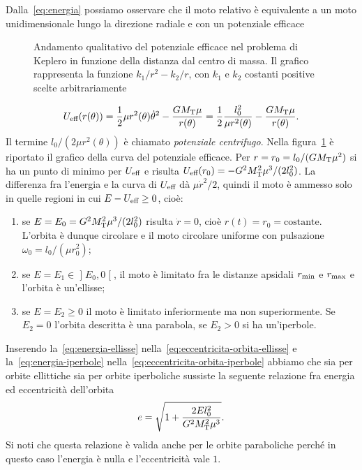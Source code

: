 Dalla~\eqref{eq:energia} possiamo osservare che il moto relativo è equivalente a
un moto unidimensionale lungo la direzione radiale e con un potenziale efficace
\begin{figure} %
  \centering
  
  \caption[Andamento del potenziale efficace in funzione della distanza dal
  centro di massa]{Andamento qualitativo del potenziale efficace nel problema di
    Keplero in funzione della distanza dal centro di massa. Il grafico
    rappresenta la funzione $k_1/r^2-k_2/r$, con $k_1$ e $k_2$ costanti positive
    scelte arbitrariamente}
  \label{fig:potenziale-efficace}
\end{figure}
\begin{equation}
  U_\textup{eff}(r(\theta)) = \frac{1}{2}\mu r^2(\theta)\dot{\theta}^2 -
  \frac{GM_\textup{T}\mu}{r(\theta)} = \frac{1}{2}\frac{l_0^2}{\mu r^2(\theta)} -
  \frac{GM_\textup{T}\mu}{r(\theta)}.
\end{equation}
Il termine $l_0/(2\mu r^2(\theta))$ è chiamato \emph{potenziale
  centrifugo}. Nella figura~\ref{fig:potenziale-efficace} è riportato il grafico
della curva del potenziale efficace. Per $r=r_0=l_0/(GM_\textup{T}\mu^2)$ si ha
un punto di minimo per $U_\textup{eff}$ e risulta $U_\textup{eff}(r_0) =
-G^2M_\textup{T}^2\mu^3/(2l_0^2)$. La differenza fra l'energia e la curva di
$U_\textup{eff}$ dà $\mu\dot{r}^2/2$, quindi il moto è ammesso solo in quelle
regioni in cui $E-U_\textup{eff}\geq 0$, cioè:
\begin{enumerate}
\item se $E = E_0 = G^2M_\textup{T}^2\mu^3/(2l_0^2)$ risulta $\dot{r}=0$, cioè
  $r(t) = r_0 = \text{costante}$. L'orbita è dunque circolare e il moto
  circolare uniforme con pulsazione $\omega_0 = l_0/(\mu r_0^2)$;
\item se $E = E_1 \in \mathopen{]}E_0,0\mathclose{[}$, il moto è limitato fra le
  distanze apsidali $r_\textup{min}$ e $r_\textup{max}$ e l'orbita è un'ellisse;
\item se $E = E_2 \geq 0$ il moto è limitato inferiormente ma non
  superiormente. Se $E_2 = 0$ l'orbita descritta è una parabola, se $E_2>0$ si
  ha un'iperbole.
\end{enumerate}

Inserendo la~\eqref{eq:energia-ellisse}
nella~\eqref{eq:eccentricita-orbita-ellisse} e la~\eqref{eq:energia-iperbole}
nella~\eqref{eq:eccentricita-orbita-iperbole} abbiamo che sia per orbite
ellittiche sia per orbite iperboliche sussiste la seguente relazione fra energia
ed eccentricità dell'orbita
\begin{equation}
  e = \sqrt{1+\frac{2El_0^2}{G^2M_\textup{T}^2\mu^3}}.
\end{equation}
Si noti che questa relazione è valida anche per le orbite paraboliche perché in
questo caso l'energia è nulla e l'eccentricità vale $1$.


